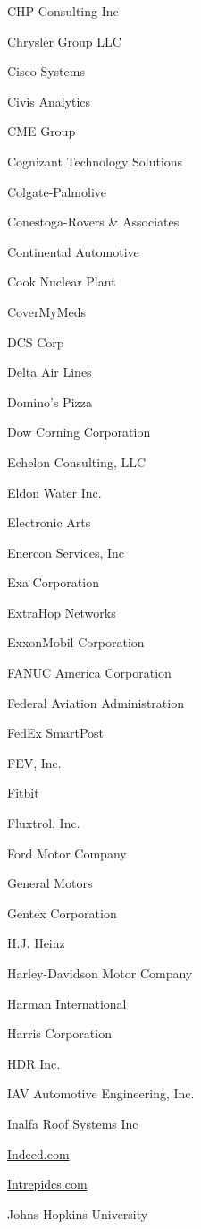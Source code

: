 \documentclass[twoside]{article}
\begin{document}
\begin{center}
\begin{multicols}{5}
\begin{FlushLeft}
\begin{compactitem}
\item CHP Consulting Inc
\item Chrysler Group LLC
\item Cisco Systems
\item Civis Analytics
\item CME Group
\item Cognizant Technology Solutions
\item Colgate-Palmolive
\item Conestoga-Rovers \& Associates
\item Continental Automotive
\item Cook Nuclear Plant
\item CoverMyMeds
\item DCS Corp
\item Delta Air Lines
\item Domino's Pizza
\item Dow Corning Corporation
\item Echelon Consulting, LLC
\item Eldon Water Inc.
\item Electronic Arts
\item Enercon Services, Inc
\item Exa Corporation
\item ExtraHop Networks
\item ExxonMobil Corporation
\item FANUC America Corporation
\item Federal Aviation Administration
\item FedEx SmartPost
\item FEV, Inc.
\item Fitbit
\item Fluxtrol, Inc.
\item Ford Motor Company
\item General Motors
\item Gentex Corporation
\item H.J. Heinz
\item Harley-Davidson Motor Company
\item Harman International
\item Harris Corporation
\item HDR Inc.
\item IAV Automotive Engineering, Inc.
\item Inalfa Roof Systems Inc
\item \url{Indeed.com}
\item \url{Intrepidcs.com}
\item Johns Hopkins University

\end{compactitem}
\end{FlushLeft}
\end{multicols}
\end{center}
\end{document}
